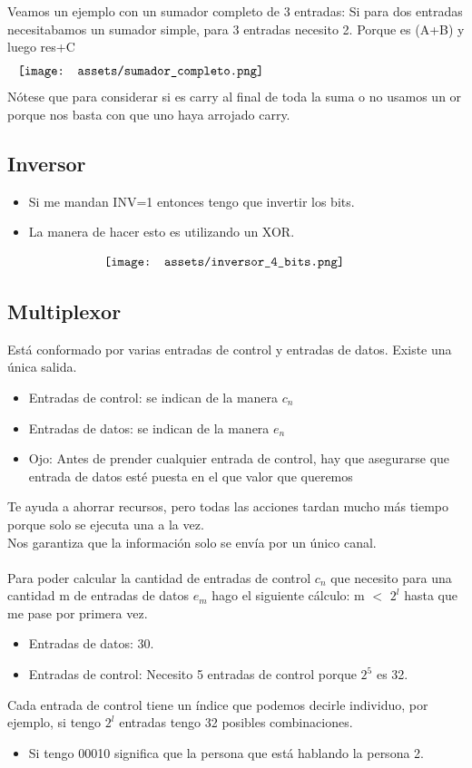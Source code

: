 \documentclass[10pt,a4paper]{article}
\begin{document}
Veamos un ejemplo con un sumador completo de 3 entradas: Si para dos entradas necesitabamos un sumador simple, para 3 entradas necesito 2. Porque es (A+B) y luego res+C
\[\begin{minipage}[b]{1\textwidth}
    \texttt{[image: assets/sumador\_completo.png]}
    \label{fig:sumador_completo}
\end{minipage}\]
Nótese que para considerar si es carry al final de toda la suma o no usamos un or porque nos basta con que uno haya arrojado carry.

\subsection*{Inversor}
\begin{itemize}
    \item Si me mandan INV=1 entonces tengo que invertir los bits.
    \item La manera de hacer esto es utilizando un XOR.
\end{itemize} 
\[\begin{minipage}[b]{0.6\textwidth}
    \texttt{[image: assets/inversor\_4\_bits.png]}
    \label{fig:inversor_4_bits}
\end{minipage}\]


\subsection*{Multiplexor}
Está conformado por varias entradas de control y entradas de datos. Existe una única salida.
\begin{itemize}
    \item Entradas de control: se indican de la manera \(c_{n}\)
    \item Entradas de datos: se indican de la manera \(e_{n}\)
    \item Ojo: Antes de prender cualquier entrada de control, hay que asegurarse que entrada de datos esté puesta en el que valor que queremos
\end{itemize} 
Te ayuda a ahorrar recursos, pero todas las acciones tardan mucho más tiempo porque solo se ejecuta una a la vez. \\
Nos garantiza que la información solo se envía por un único canal. \\
\\
Para poder calcular la cantidad de entradas de control \(c_{n}\) que necesito para una cantidad m de entradas de datos \(e_{m}\) hago el siguiente cálculo: m \(<\) \(2^{l}\) hasta que me pase por primera vez.
\begin{itemize}
    \item Entradas de datos: 30.
    \item Entradas de control: Necesito 5 entradas de control porque \(2^{5}\) es 32.
\end{itemize} 
Cada entrada de control tiene un índice que podemos decirle individuo, por ejemplo, si tengo \(2^{l}\) entradas tengo 32 posibles combinaciones.
\begin{itemize}
    \item Si tengo 00010 significa que la persona que está hablando la persona 2.
\end{itemize}
\end{document}
